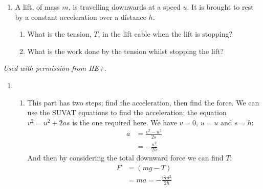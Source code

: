 

\begin{problem}[HE+_Lift]%
{\begin{enumerate}
\item A lift, of  mass $m$, is travelling downwards at a speed $u$. It is brought to rest by a constant acceleration over a distance $h$. 
\begin{enumerate} 
	\item What is the tension, $T$, in the lift cable when the lift is stopping?
	\item What is the work done by the tension whilst stopping the lift?
\end{enumerate}
\end{enumerate}
}
{\textit{Used with permission from HE+.}}
{\begin{enumerate}
\item
\begin{enumerate}
	\item This part has two steps; find the acceleration, then find the force. We can use the SUVAT equations to find the acceleration; the equation $v^{2} = u^{2} + 2as$ is the one required here. We have $v = 0$, $u = u$ and $s = h$:
\begin{align*} a &= \frac{v^{2} - u^{2}}{2s} \\ &= -\frac{u^{2}}{2h} \end{align*}
And then by considering the total downward force we can find $T$:
\begin{align*} F &= (mg - T) \\ &= ma = -\frac{mu^{2}}{2h} \end{align*}

\end{enumerate}
\end{enumerate}}
\end{problem}
